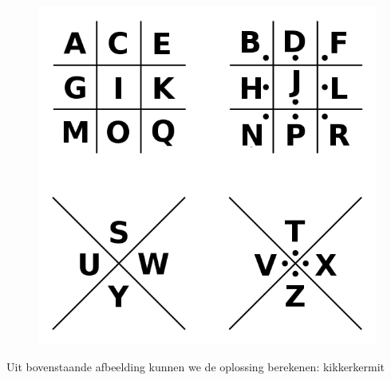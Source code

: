 \begin{figure}[H]
\centering
\includegraphics[scale=0.5]{encryptie/oef16.png}
\end{figure}
Uit bovenstaande afbeelding kunnen we de oplossing berekenen: kikkerkermit
